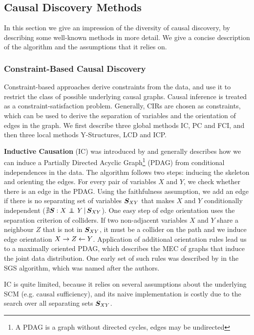 \subsection{Causal Discovery Methods}

In this section we give an impression of the diversity of causal discovery, by describing some well-known methods in more detail. We give a concise description of the algorithm and the assumptions that it relies on.

\subsubsection{Constraint-Based Causal Discovery}
Constraint-based approaches derive constraints from the data, and use it to restrict the class of possible underlying causal graphs. Causal inference is treated as a constraint-satisfaction problem. Generally, CIRs are chosen as constraints, which can be used to derive the separation of variables and the orientation of edges in the graph. We first describe three global methods IC, PC and FCI, and then three local methods Y-Structures, LCD and ICP.

\textbf{Inductive Causation} (IC) was introduced by \citet{verma1991equivalence} and generally describes how we can induce a Partially Directed Acyclic Graph\footnote{A PDAG is a graph without directed cycles, edges may be undirected} (PDAG) from conditional independences in the data. The algorithm follows two steps: inducing the skeleton and orienting the edges. For every pair of variables $X$ and $Y$, we check whether there is an edge in the PDAG. Using the faithfulness assumption, we add an edge if there is no separating set of variables $\bm{S}_{XY}$ that makes $X$ and $Y$ conditionally independent ($\nexists \bm{S} : {X} \operatorname*{{\,\perp\mkern-12mu\perp\,}}_{} {Y} \,|\, {\bm{S}_{XY}}$). One easy step of edge orientation uses the separation criterion of colliders. If two non-adjacent variables $X$ and $Y$ share a neighbour $Z$ that is not in $\bm{S}_{XY}$, it must be a collider on the path and we induce edge orientation $X\to Z \leftarrow Y$. Application of additional orientation rules lead us to a maximally oriented PDAG, which describes the MEC of graphs that induce the joint data distribution. One early set of such rules was described by \citet{spirtes2000causation} in the SGS algorithm, which was named after the authors.
            
IC is quite limited, because it relies on several assumptions about the underlying SCM (e.g. causal sufficiency), and its naive implementation is costly due to the search over all separating sets $\bm{S}_{XY}$.

